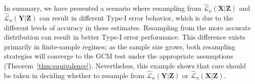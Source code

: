 \documentclass[aos]{imsart}
\theoremstyle{definition}
\theoremstyle{remark}
\newcommand{\prx}{\bm X}								%
\newcommand{\prz}{\bm Z}								%
\newcommand{\pry}{{\bm Y}}								%
\newcommand{\lawhat}{\widehat{\mathcal L}}				%
\begin{document}
	In summary, we have presented a scenario where resampling from $\lawhat_n(\prx|\prz)$ and $\lawhat_n(\pry|\prz)$ can result in different Type-I error behavior, which is due to the different levels of accuracy in these estimates. Resampling from the more accurate distribution can result in better Type-I error performance. This difference exists primarily in finite-sample regimes; as the sample size grows, both resampling strategies will converge to the GCM test under the appropriate assumptions (Theorem~\ref{thm:equivalence}). Nevertheless, this example shows that care should be taken in deciding whether to resample from $\lawhat_n(\pry|\prz)$ or $\lawhat_n(\prx|\prz)$.


	\clearpage

\end{document}
